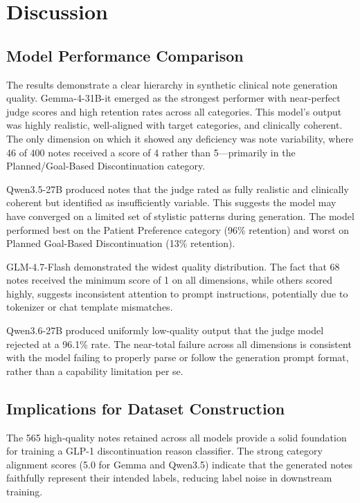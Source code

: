 \documentclass[11pt, a4paper]{article}
\begin{document}
\section{Discussion}

\subsection{Model Performance Comparison}

The results demonstrate a clear hierarchy in synthetic clinical note generation quality. Gemma-4-31B-it emerged as the strongest performer with near-perfect judge scores and high retention rates across all categories. This model's output was highly realistic, well-aligned with target categories, and clinically coherent. The only dimension on which it showed any deficiency was note variability, where 46 of 400 notes received a score of 4 rather than 5---primarily in the Planned/Goal-Based Discontinuation category.

Qwen3.5-27B produced notes that the judge rated as fully realistic and clinically coherent but identified as insufficiently variable. This suggests the model may have converged on a limited set of stylistic patterns during generation. The model performed best on the Patient Preference category (96\% retention) and worst on Planned Goal-Based Discontinuation (13\% retention).

GLM-4.7-Flash demonstrated the widest quality distribution. The fact that 68 notes received the minimum score of 1 on all dimensions, while others scored highly, suggests inconsistent attention to prompt instructions, potentially due to tokenizer or chat template mismatches.

Qwen3.6-27B produced uniformly low-quality output that the judge model rejected at a 96.1\% rate. The near-total failure across all dimensions is consistent with the model failing to properly parse or follow the generation prompt format, rather than a capability limitation per se.

\subsection{Implications for Dataset Construction}

The 565 high-quality notes retained across all models provide a solid foundation for training a GLP-1 discontinuation reason classifier. The strong category alignment scores (5.0 for Gemma and Qwen3.5) indicate that the generated notes faithfully represent their intended labels, reducing label noise in downstream training.
\end{document}
